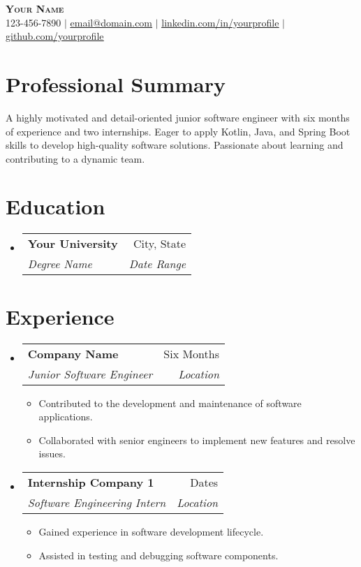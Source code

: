 \documentclass[letterpaper,11pt]{article}
\makeatletter
\newcommand{\resumeItem}[1]{
\item\small{
{#1 \vspace{-2pt}}
}
}
\newcommand{\resumeSubheading}[4]{
\vspace{-2pt}\item
\begin{tabular*}{0.97\textwidth}[t]{l@{\extracolsep{\fill}}r}
\textbf{#1} & #2 \\
\textit{\small#3} & \textit{\small #4} \\
\end{tabular*}\vspace{-7pt}
}
\newcommand{\resumeSubHeadingListStart}{\begin{itemize}[leftmargin=0.15in, label={}]}
\newcommand{\resumeSubHeadingListEnd}{\end{itemize}}
\newcommand{\resumeItemListStart}{\begin{itemize}}
\newcommand{\resumeItemListEnd}{\end{itemize}\vspace{-5pt}}
\makeatother
\begin{document}
\begin{center}
\textbf{\Huge \scshape Your Name} \\ \vspace{1pt}
\small 123-456-7890 $|$ \href{mailto:email@domain.com}{\underline{email@domain.com}} $|$
\href{https://linkedin.com/in/...}{\underline{linkedin.com/in/yourprofile}} $|$
\href{https://github.com/...}{\underline{github.com/yourprofile}}
\end{center}


\section{Professional Summary} %
A highly motivated and detail-oriented junior software engineer with six months of experience and two internships. Eager to apply Kotlin, Java, and Spring Boot skills to develop high-quality software solutions. Passionate about learning and contributing to a dynamic team.

\section{Education}
\resumeSubHeadingListStart
\resumeSubheading{Your University}{City, State}{Degree Name}{Date Range}
\resumeSubHeadingListEnd

\section{Experience}
\resumeSubHeadingListStart
\resumeSubheading{Company Name}{Six Months}{Junior Software Engineer}{Location}
\resumeItemListStart
\resumeItem{Contributed to the development and maintenance of software applications.}
\resumeItem{Collaborated with senior engineers to implement new features and resolve issues.}
\resumeItemListEnd
\resumeSubHeadingListEnd

\resumeSubHeadingListStart
\resumeSubheading{Internship Company 1}{Dates}{Software Engineering Intern}{Location}
\resumeItemListStart
\resumeItem{Gained experience in software development lifecycle.}
\resumeItem{Assisted in testing and debugging software components.}
\resumeItemListEnd
\resumeSubHeadingListEnd
\end{document}
